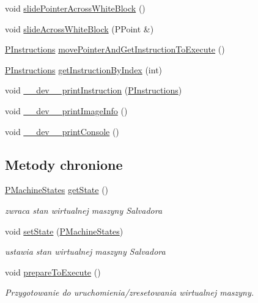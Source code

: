 \begin{CompactItemize}
\item 
void \hyperlink{classPVirtualMachine_e37d4dfa512c3dd97b9958f013ffb7b3}{slidePointerAcrossWhiteBlock} ()
\item 
void \hyperlink{classPVirtualMachine_4b2ebb998393324c5240dc48fdb14f3a}{slideAcrossWhiteBlock} (PPoint \&)
\item 
\hyperlink{penums_8h_797d2a71195500b970298fbf455ff83a}{PInstructions} \hyperlink{classPVirtualMachine_29279548406a588bce03e320354cd857}{movePointerAndGetInstructionToExecute} ()
\item 
\hyperlink{penums_8h_797d2a71195500b970298fbf455ff83a}{PInstructions} \hyperlink{classPVirtualMachine_69d12176d3f9719b2bdf93a9f55cefde}{getInstructionByIndex} (int)
\item 
void \hyperlink{classPVirtualMachine_91c888349242ed7700d5ddff5b187c19}{\_\-\_\-dev\_\-\_\-printInstruction} (\hyperlink{penums_8h_797d2a71195500b970298fbf455ff83a}{PInstructions})
\item 
void \hyperlink{classPVirtualMachine_d0ac4994cbf5c218a40442df49a3cd29}{\_\-\_\-dev\_\-\_\-printImageInfo} ()
\item 
void \hyperlink{classPVirtualMachine_9fbb7c0313e22051eebfd2e316ec609b}{\_\-\_\-dev\_\-\_\-printConsole} ()
\end{CompactItemize}
\subsection*{Metody chronione}
\begin{CompactItemize}
\item 
\hyperlink{penums_8h_3b12ec7c990da3435462047165bc0c6d}{PMachineStates} \hyperlink{classPVirtualMachine_699839f4df2106065458127c36b4bfca}{getState} ()
\begin{CompactList}\small\item\em zwraca stan wirtualnej maszyny Salvadora \item\end{CompactList}\item 
void \hyperlink{classPVirtualMachine_bede8c1e068c19b9bc61a957de70cda8}{setState} (\hyperlink{penums_8h_3b12ec7c990da3435462047165bc0c6d}{PMachineStates})
\begin{CompactList}\small\item\em ustawia stan wirtualnej maszyny Salvadora \item\end{CompactList}\item 
void \hyperlink{classPVirtualMachine_513af8673f1430cd04fd0a0e46abedd4}{prepareToExecute} ()
\begin{CompactList}\small\item\em Przygotowanie do uruchomienia/zresetowania wirtualnej maszyny. \item\end{CompactList}\end{CompactItemize}
